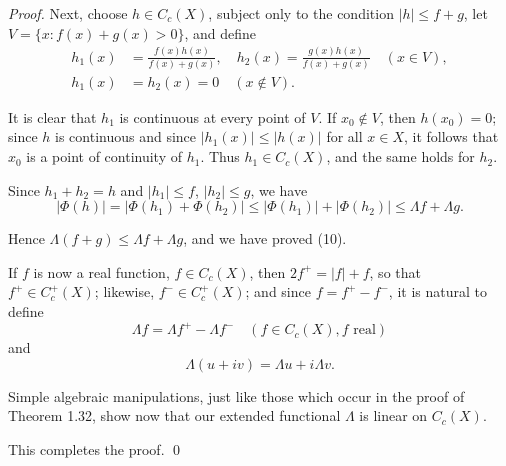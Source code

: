 \begin{proof}
Next, choose $h \in C_c(X)$, subject only to the condition $|h| \leq f + g$, let $V = \{x : f(x) + g(x) > 0\}$, and define
\begin{align}
h_1(x) &= \frac{f(x)h(x)}{f(x) + g(x)}, \quad h_2(x) = \frac{g(x)h(x)}{f(x) + g(x)} \quad (x \in V), \tag{12}\\
h_1(x) &= h_2(x) = 0 \quad (x \notin V).
\end{align}

It is clear that $h_1$ is continuous at every point of $V$. If $x_0 \notin V$, then $h(x_0) = 0$; since $h$ is continuous and since $|h_1(x)| \leq |h(x)|$ for all $x \in X$, it follows that $x_0$ is a point of continuity of $h_1$. Thus $h_1 \in C_c(X)$, and the same holds for $h_2$.

Since $h_1 + h_2 = h$ and $|h_1| \leq f$, $|h_2| \leq g$, we have
\begin{equation}
|\Phi(h)| = |\Phi(h_1) + \Phi(h_2)| \leq |\Phi(h_1)| + |\Phi(h_2)| \leq \Lambda f + \Lambda g.
\end{equation}

Hence $\Lambda(f + g) \leq \Lambda f + \Lambda g$, and we have proved (10).

If $f$ is now a real function, $f \in C_c(X)$, then $2f^+ = |f| + f$, so that $f^+ \in C_c^+(X)$; likewise, $f^- \in C_c^+(X)$; and since $f = f^+ - f^-$, it is natural to define
\begin{equation}
\Lambda f = \Lambda f^+ - \Lambda f^- \quad (f \in C_c(X), f \text{ real}) \tag{13}
\end{equation}
and
\begin{equation}
\Lambda(u + iv) = \Lambda u + i\Lambda v. \tag{14}
\end{equation}

Simple algebraic manipulations, just like those which occur in the proof of Theorem 1.32, show now that our extended functional $\Lambda$ is linear on $C_c(X)$.

This completes the proof. \qed
\end{proof}

